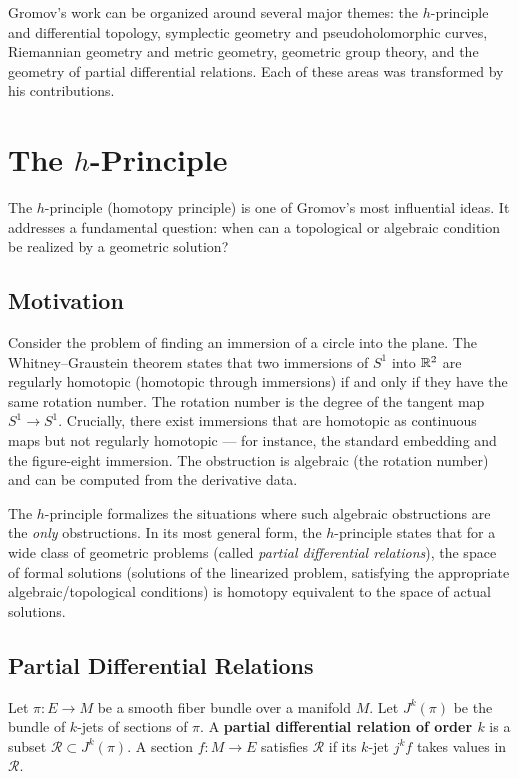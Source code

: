Gromov's work can be organized around several major themes: the \(h\)-principle and differential topology, symplectic geometry and pseudoholomorphic curves, Riemannian geometry and metric geometry, geometric group theory, and the geometry of partial differential relations. Each of these areas was transformed by his contributions.

\section{The \texorpdfstring{\(h\)}{h}-Principle}

The \(h\)-principle (homotopy principle) is one of Gromov's most influential ideas. It addresses a fundamental question: when can a topological or algebraic condition be realized by a geometric solution?

\subsection{Motivation}

Consider the problem of finding an immersion of a circle into the plane. The Whitney--Graustein theorem states that two immersions of \(S^1\) into \(\mathbb{R}^2\) are regularly homotopic (homotopic through immersions) if and only if they have the same rotation number. The rotation number is the degree of the tangent map \(S^1 \to S^1\). Crucially, there exist immersions that are homotopic as continuous maps but not regularly homotopic --- for instance, the standard embedding and the figure-eight immersion. The obstruction is algebraic (the rotation number) and can be computed from the derivative data.

The \(h\)-principle formalizes the situations where such algebraic obstructions are the \textit{only} obstructions. In its most general form, the \(h\)-principle states that for a wide class of geometric problems (called \textit{partial differential relations}), the space of formal solutions (solutions of the linearized problem, satisfying the appropriate algebraic/topological conditions) is homotopy equivalent to the space of actual solutions.

\subsection{Partial Differential Relations}

Let \(\pi: E \to M\) be a smooth fiber bundle over a manifold \(M\). Let \(J^k(\pi)\) be the bundle of \(k\)-jets of sections of \(\pi\). A \textbf{partial differential relation of order \(k\)} is a subset \(\mathcal{R} \subset J^k(\pi)\). A section \(f: M \to E\) satisfies \(\mathcal{R}\) if its \(k\)-jet \(j^k f\) takes values in \(\mathcal{R}\).

